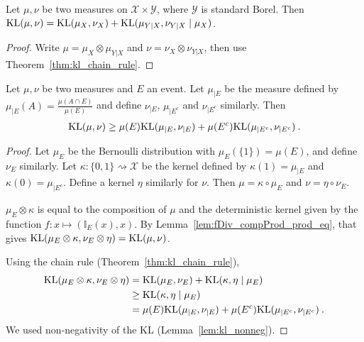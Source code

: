 \begin{theorem}
  \label{thm:kl_chain_rule_prod}
  Let $\mu, \nu$ be two measures on $\mathcal X \times \mathcal Y$, where $\mathcal Y$ is standard Borel.
  Then $\mathrm{KL}(\mu, \nu) = \mathrm{KL}(\mu_X, \nu_X) + \mathrm{KL}(\mu_{Y|X}, \nu_{Y|X} \mid \mu_X)$.
\end{theorem}

\begin{proof}
Write $\mu = \mu_X \otimes \mu_{Y|X}$ and $\nu = \nu_X \otimes \nu_{Y|X}$, then use Theorem~\ref{thm:kl_chain_rule}.
\end{proof}

\begin{lemma}
  \label{thm:kl_chain_rule_cond_event}
  Let $\mu, \nu$ be two measures and $E$ an event. Let $\mu_{|E}$ be the measure defined by $\mu_{|E}(A) = \frac{\mu(A \cap E)}{\mu(E)}$ and define $\nu_{|E}$, $\mu_{| E^c}$ and $\nu_{| E^c}$ similarly. Then
  \begin{align*}
  \mathrm{KL}(\mu, \nu) \ge \mu(E) \mathrm{KL}(\mu_{|E}, \nu_{|E}) + \mu(E^c) \mathrm{KL}(\mu_{|E^c}, \nu_{|E^c}) \: .
  \end{align*}
\end{lemma}

\begin{proof}
Let $\mu_E$ be the Bernoulli distribution with $\mu_E(\{1\}) = \mu(E)$, and define $\nu_E$ similarly.
Let $\kappa : \{0,1\} \rightsquigarrow \mathcal X$ be the kernel defined by $\kappa(1) = \mu_{|E}$ and $\kappa(0) = \mu_{|E^c}$. Define a kernel $\eta$ similarly for $\nu$.
Then $\mu = \kappa \circ \mu_E$ and $\nu = \eta \circ \nu_E$.

$\mu_E \otimes \kappa$ is equal to the composition of $\mu$ and the deterministic kernel given by the function $f : x \mapsto (\mathbb{I}_E(x), x)$. By Lemma~\ref{lem:fDiv_compProd_prod_eq}, that gives $\mathrm{KL}(\mu_E \otimes \kappa, \nu_E \otimes \eta) = \mathrm{KL}(\mu, \nu)$.

Using the chain rule (Theorem~\ref{thm:kl_chain_rule}),
\begin{align*}
\mathrm{KL}(\mu_E \otimes \kappa, \nu_E \otimes \eta)
&= \mathrm{KL}(\mu_E, \nu_E) + \mathrm{KL}(\kappa, \eta \mid \mu_E)
\\
&\ge \mathrm{KL}(\kappa, \eta \mid \mu_E)
\\
&= \mu(E) \mathrm{KL}(\mu_{|E}, \nu_{|E}) + \mu(E^c) \mathrm{KL}(\mu_{|E^c}, \nu_{|E^c})
\: .
\end{align*}
We used non-negativity of the KL (Lemma~\ref{lem:kl_nonneg}).

\end{proof}

